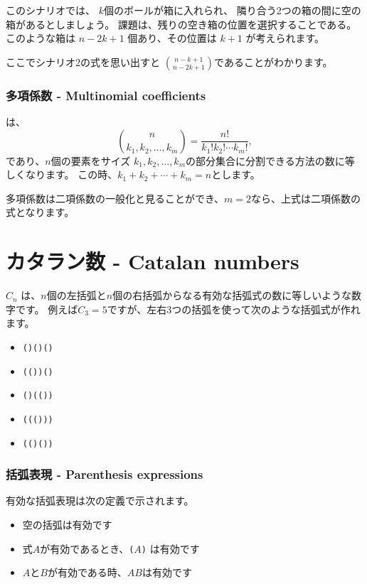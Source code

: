 このシナリオでは、
$k$個のボールが箱に入れられ、
隣り合う2つの箱の間に空の箱があるとしましょう。
課題は、残りの空き箱の位置を選択することである。
このような箱は $n-2k+1$ 個あり、その位置は $k+1$ が考えられます。

ここでシナリオ2の式を思い出すと
${n-k+1 \choose n-2k+1}$であることがわかります。

\subsubsection{多項係数 - Multinomial coefficients}


は、
\[ {n \choose k_1,k_2,\ldots,k_m} = \frac{n!}{k_1! k_2! \cdots k_m!}, \]
であり、$n$個の要素をサイズ $k_1,k_2,\ldots,k_m$の部分集合に分割できる方法の数に等しくなります。
この時、$k_1+k_2+\cdots+k_m=n$とします。

多項係数は二項係数の一般化と見ることができ、$m = 2$なら、上式は二項係数の式となります。

\section{カタラン数 - Catalan numbers}


$C_n$ は、$n$個の左括弧と$n$個の右括弧からなる有効な括弧式の数に等しいような数字です。
例えば$C_3=5$ですが、左右3つの括弧を使って次のような括弧式が作れます。

\begin{itemize}[noitemsep]
\item \texttt{()()()}
\item \texttt{(())()}
\item \texttt{()(())}
\item \texttt{((()))}
\item \texttt{(()())}
\end{itemize}

\subsubsection{括弧表現 - Parenthesis expressions}


有効な括弧表現は次の定義で示されます。

\begin{itemize}
\item 空の括弧は有効です
\item 式$A$が有効であるとき、\texttt{(}$A$\texttt{)} は有効です
\item $A$と$B$が有効である時、$AB$は有効です
\end{itemize}

